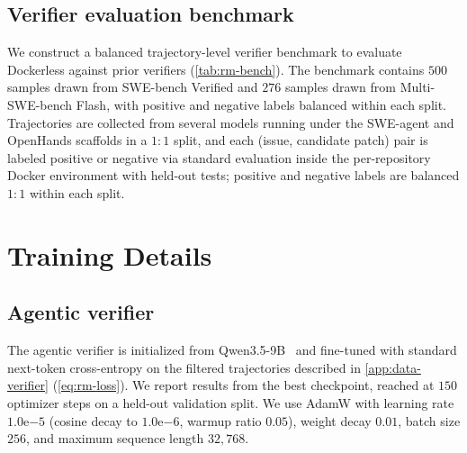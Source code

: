 \documentclass{llmxive}
\providecommand{\todo}[1]{}
\providecommand{\approach}{Dockerless\xspace}
\providecommand{\zeng}[1]{\textbf{[Zeng: #1]}}
\begin{document}
\subsection{Verifier evaluation benchmark}
\label{app:rm-bench}

We construct a balanced trajectory-level verifier benchmark to evaluate \approach against prior verifiers (\cref{tab:rm-bench}).
The benchmark contains $500$ samples drawn from SWE-bench Verified and $276$ samples drawn from Multi-SWE-bench Flash, with positive and negative labels balanced within each split.
Trajectories are collected from several models running under the SWE-agent and OpenHands scaffolds in a $1{:}1$ split, and each (issue, candidate patch) pair is labeled positive or negative via standard evaluation inside the per-repository Docker environment with held-out tests; positive and negative labels are balanced $1{:}1$ within each split.


\section{Training Details}
\label{app:training}


\subsection{Agentic verifier}
\label{app:training-verifier}

The agentic verifier is initialized from Qwen3.5-9B~\citep{team2026qwen35} and fine-tuned with standard next-token cross-entropy on the filtered trajectories described in \cref{app:data-verifier} (\cref{eq:rm-loss}).
We report results from the best checkpoint, reached at $150$ optimizer steps on a held-out validation split.
We use AdamW with learning rate $1.0\mathrm{e}{-5}$ (cosine decay to $1.0\mathrm{e}{-6}$, warmup ratio $0.05$), weight decay $0.01$, batch size $256$, and maximum sequence length $32{,}768$.
\end{document}
